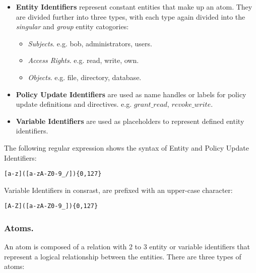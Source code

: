 \documentclass{llncs}
\begin{document}
        \begin{itemize}
          \item
            {\bf Entity Identifiers} represent constant entities that make
            up an atom. They are divided further into three types, with each
            type again divided into the {\em singular} and {\em group} entity
            catogories:
 
            \begin{itemize}
              \item
                {\em Subjects}. e.g. bob, administrators, users.
              \item
                {\em Access Rights}. e.g. read, write, own.
              \item
                {\em Objects}. e.g. file, directory, database.
            \end{itemize}
          \vspace{1mm}
          \item
            {\bf Policy Update Identifiers} are used as name handles or labels
            for policy update definitions and directives. e.g. $grant\_read$,
            $revoke\_write$.
 
          \vspace{1mm}
          \item
            {\bf Variable Identifiers} are used as placeholders to represent
            defined entity identifiers.
        \end{itemize}
 
        The following regular expression shows the syntax of Entity and
        Policy Update Identifiers:
 
        \begin{verbatim}[a-z]([a-zA-Z0-9_/]){0,127}\end{verbatim}
 
        Variable Identifiers in consrast, are prefixed with an upper-case
        character:
 
        \begin{verbatim}[A-Z]([a-zA-Z0-9_]){0,127}\end{verbatim}

      \subsubsection{Atoms.}

        An atom is composed of a relation with 2 to 3 entity or variable
        identifiers that represent a logical relationship between the entities.
        There are three types of atoms:
\end{document}

